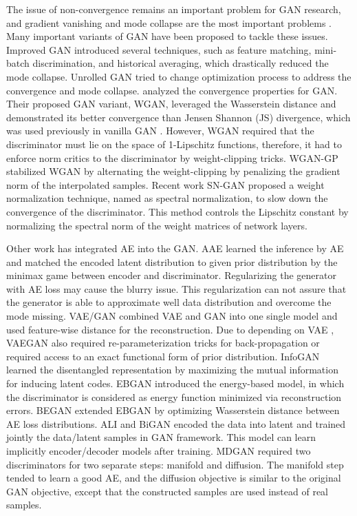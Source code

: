 \documentclass[runningheads]{llncs}
\begin{document}
The issue of non-convergence  remains an important problem for GAN research, and  gradient vanishing and mode collapse are the most important problems \cite{goodfellow-nips-2016,arjovsky-arxiv-2017a}. Many important variants of GAN have been proposed to tackle these issues. Improved GAN \cite{salimans-nisp-2016} introduced several techniques, such as feature matching, mini-batch discrimination, and historical averaging, which drastically reduced the mode collapse. Unrolled GAN \cite{metz-arxiv-2016} tried to change optimization process to address the convergence and mode collapse. \cite{arjovsky-arxiv-2017} analyzed the convergence properties for GAN. Their proposed GAN variant, WGAN, leveraged the Wasserstein distance and demonstrated its better convergence than Jensen Shannon (JS) divergence, which was used previously in vanilla GAN \cite{goodfellow-nisp-2014}. However, WGAN required that the discriminator must lie on the space of 1-Lipschitz functions, therefore, it had to enforce norm critics to the discriminator by weight-clipping tricks. WGAN-GP \cite{gulrajani-arxiv-2017} stabilized WGAN by alternating the weight-clipping by penalizing the gradient norm of the interpolated samples. Recent work SN-GAN \cite{miyato-iclr-2018} proposed a weight normalization technique, named as spectral normalization, to slow down the convergence of the discriminator. This method controls the Lipschitz constant by normalizing the spectral norm of the weight matrices of network layers.

Other work has integrated AE into the GAN. AAE \cite{makhzani-arxiv-2015} learned the inference by AE and matched the encoded latent distribution to given prior distribution by the minimax game between encoder and discriminator. Regularizing the generator with AE loss may cause the blurry issue. This regularization can not assure that the generator is able to approximate well data distribution and overcome the mode missing. VAE/GAN \cite{larsen-arxiv-2015} combined VAE and GAN into one single model and used feature-wise distance for the reconstruction. Due to depending on VAE \cite{kingma-arxiv-2013}, VAEGAN also required re-parameterization tricks for back-propagation or required access to an exact functional form of prior distribution. InfoGAN \cite{chen-arxiv-2016} learned the disentangled representation by maximizing the mutual information for inducing latent codes. EBGAN \cite{zhao-arxiv-2016} introduced the energy-based model, in which the discriminator is considered as energy function minimized via reconstruction errors. BEGAN \cite{berthelot-arxiv-2017} extended EBGAN by optimizing Wasserstein distance between AE loss distributions. ALI \cite{dumoulin-arxiv-2016} and BiGAN \cite{donahue-arxiv-2016} encoded the data into latent and trained jointly the data/latent samples in GAN framework. This model can learn implicitly encoder/decoder models after training. MDGAN \cite{che-arxiv-2016} required two discriminators for two separate steps: manifold and diffusion. The manifold step tended to learn a good AE, and the diffusion objective is similar to the original GAN objective, except that the constructed samples are used instead of real samples.
\end{document}
